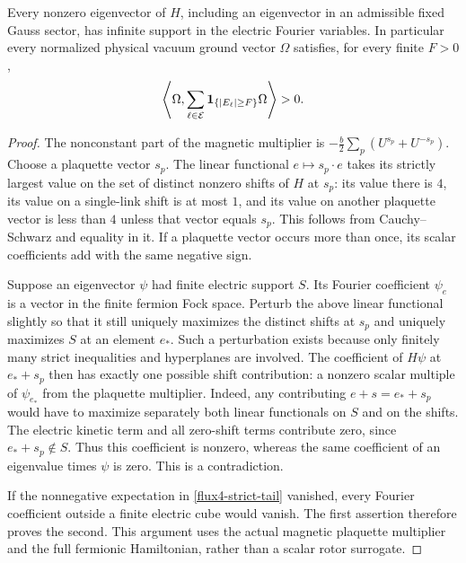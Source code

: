 \begin{proposition}
\label{flux4-vacuum-tails}
Every nonzero eigenvector of $H$, including an eigenvector in an
admissible fixed Gauss sector, has infinite support in the electric
Fourier variables.  In particular every normalized physical vacuum
ground vector $\Omega$ satisfies, for every finite $F>0$,
\begin{equation}
 \left\langle\Omega,
   \sum_{\ell\in\mathcal E}{\bf1}_{\{|E_\ell|\ge F\}}
   \Omega\right\rangle>0.
 \label{flux4-strict-tail}
\end{equation}
\end{proposition}
\begin{proof}
The nonconstant part of the magnetic multiplier is
$-\frac b2\sum_p(U^{s_p}+U^{-s_p})$.  Choose a plaquette vector $s_p$.
The linear functional $e\mapsto s_p\cdot e$ takes its strictly largest
value on the set of distinct nonzero shifts of $H$ at $s_p$: its value
there is $4$, its value on a single-link shift is at most $1$, and its
value on another plaquette vector is less than $4$ unless that vector
equals $s_p$.  This follows from Cauchy--Schwarz and equality in it.
If a plaquette vector occurs more than once, its scalar coefficients
add with the same negative sign.

Suppose an eigenvector $\psi$ had finite electric support $S$.
Its Fourier coefficient $\psi_e$ is a vector in the finite fermion
Fock space.  Perturb the above linear functional slightly so that
it still uniquely maximizes the distinct shifts at $s_p$ and uniquely
maximizes $S$ at an element $e_*$.  Such a perturbation exists because
only finitely many strict inequalities and hyperplanes are involved.
The coefficient of $H\psi$ at $e_*+s_p$ then has exactly one possible
shift contribution: a nonzero scalar multiple of $\psi_{e_*}$ from
the plaquette multiplier.  Indeed, any contributing $e+s=e_*+s_p$
would have to maximize separately both linear functionals on $S$
and on the shifts.  The electric kinetic term and all zero-shift
terms contribute zero, since $e_*+s_p\notin S$.  Thus this coefficient
is nonzero, whereas the same coefficient of an eigenvalue times
$\psi$ is zero.  This is a contradiction.

If the nonnegative expectation in \eqref{flux4-strict-tail} vanished,
every Fourier coefficient outside a finite electric cube would vanish.
The first assertion therefore proves the second.  This argument uses
the actual magnetic plaquette multiplier and the full fermionic
Hamiltonian, rather than a scalar rotor surrogate.
\end{proof}

